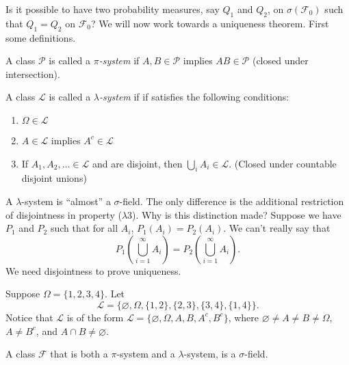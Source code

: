 \documentclass[11pt,fleqn]{book} %
\begin{document}
Is it possible to have two probability measures, say $Q_1$ and $Q_2$, on $\sigma(\mathcal{F}_0)$ such that $Q_1=Q_2$ on $\mathcal{F}_0$? We will now work towards a uniqueness theorem. First some definitions.

\begin{definition}[$\pi$-system] \label{def:pi-system}
	A class $\mathcal{P}$ is called a \emph{$\pi$-system} if $A,B \in \mathcal{P}$ implies $AB \in \mathcal{P}$ (closed under intersection).
\end{definition}

\begin{definition} \label{def:lambda-system}
	A class $\mathcal{L}$ is called a \emph{$\lambda$-system} if if satisfies the following conditions:
	\begin{enumerate}[label=($\lambda$\arabic*)]
		\item $\Omega \in \mathcal{L}$
		\item $A \in \mathcal{L}$ implies $A^c \in \mathcal{L}$
		\item If $A_1,A_2,\dots \in \mathcal{L}$ and are disjoint, then $\bigcup_i A_i \in \mathcal{L}$. (Closed under countable disjoint unions)
	\end{enumerate}
\end{definition}

A $\lambda$-system is ``almost'' a $\sigma$-field. The only difference is the additional restriction of disjointness in property ($\lambda$3). Why is this distinction made? Suppose we have $P_1$ and $P_2$ such that for all $A_i$, $P_1(A_i)=P_2(A_i)$. We can't really say that
\[
	P_1 \left( \bigcup_{i=1}^\infty A_i \right) = P_2 \left( \bigcup_{i=1}^\infty A_i \right).
\]
We need disjointness to prove uniqueness.

\begin{example} \label{ex:1.6}
	Suppose $\Omega = \{1,2,3,4\}$. Let
	\[
	\mathcal{L} = \{\varnothing, \Omega, \{1,2\}, \{2,3\}, \{3,4\}, \{1,4\}\}.
	\]
	Notice that $\mathcal{L}$ is of the form $\mathcal{L}=\{\varnothing, \Omega, A, B, A^c, B^c\}$, where $\varnothing \neq A \neq B \neq \Omega$, $A \neq B^c$, and $A \cap B \neq \varnothing$.
\end{example}

\begin{theorem} \label{thm:1.4}
	A class $\mathcal{F}$ that is both a $\pi$-system and a $\lambda$-system, is a $\sigma$-field.
\end{theorem}
\end{document}
